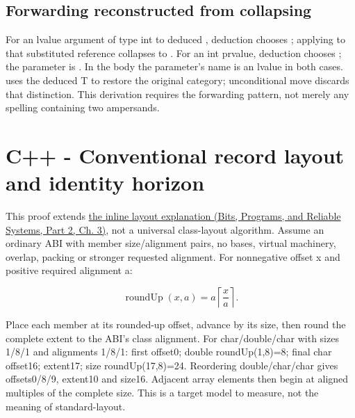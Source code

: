 \subsection{Forwarding reconstructed from collapsing}\label{03-visual-computing-i-ch018-forwarding-reconstructed-from-collapsing}

\hypertarget{03-visual-computing-i-ch018-forwarding-reconstructed-from-collapsing}{}

For an lvalue argument of type int to deduced , deduction chooses ; applying \BookInlineCode{{\&}{\&}}{\&\&} to that substituted reference collapses to . For an int prvalue, deduction chooses ; the parameter is . In the body the parameter's name is an lvalue in both cases.  uses the deduced T to restore the original category; unconditional move discards that distinction. This derivation requires the forwarding pattern, not merely any spelling containing two ampersands.

\section{C++ - Conventional record layout and identity horizon}\label{03-visual-computing-i-ch018-c---conventional-record-layout-and-identity-horizon}

\hypertarget{03-visual-computing-i-ch018-c---conventional-record-layout-and-identity-horizon}{}

This proof extends \href{../01-Bits-Programs-and-Reliable-Systems-P02/main.pdf\#01-foundations-i-ch003-bringing-the-object-model-back-to-bytes}{the inline layout explanation (Bits, Programs, and Reliable Systems, Part 2, Ch. 3)}, not a universal class-layout algorithm. Assume an ordinary ABI with member size/alignment pairs, no bases, virtual machinery, overlap, packing or stronger requested alignment. For nonnegative offset x and positive required alignment a:

\[
\operatorname{roundUp}(x,a)=a\left\lceil\frac{x}{a}\right\rceil.
\]

Place each member at its rounded-up offset, advance by its size, then round the complete extent to the ABI's class alignment. For char/double/char with sizes 1/8/1 and alignments 1/8/1: first offset0; double roundUp(1,8)=8; final char offset16; extent17; size roundUp(17,8)=24. Reordering double/char/char gives offsets0/8/9, extent10 and size16. Adjacent array elements then begin at aligned multiples of the complete size. This is a target model to measure, not the meaning of standard-layout.

